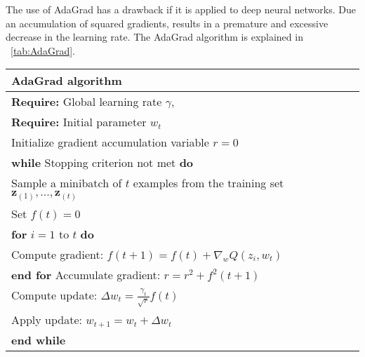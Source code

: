 The use of AdaGrad has a drawback if it is applied to deep neural networks. Due  an accumulation of squared gradients,  results in a premature and excessive decrease in the learning rate. The AdaGrad algorithm is explained in  ~\ref{tab:AdaGrad}.

\begin{center}
\begin{tabular}{| l |}
\hline
\textbf{AdaGrad algorithm}\\
\hline
\textbf{Require:} Global learning rate $\gamma$,\\
\textbf{Require:} Initial parameter $w_t$\\
 \hspace{1cm} Initialize gradient accumulation variable \textbf{$r=0$}\\
 \hspace{1cm} \textbf{while} Stopping criterion not met \textbf{do}\\
 \hspace{2cm} Sample a minibatch of $t$ examples from the training set $\textbf{z}_{(1)} ,...,        \textbf{z}_{(t)}$ \\
 \hspace{2cm} Set \textbf{$f(t) = 0$}\\
 \hspace{2cm} \textbf{for} $i=1$ to $t$ \textbf{do}\\
 \hspace{3cm} Compute gradient: \textbf{$f(t+1) = f(t) + \nabla_w Q(z_i,w_t)$}\\
 \hspace{2cm} \textbf{end for}
 \hspace{2cm} Accumulate gradient: \textbf{$r = r^2+f^2(t+1)$} \\
 \hspace{2cm} Compute update: \textbf{$\Delta w_t = \frac{\gamma_t}{\sqrt{r}} f(t)$}\\
 \hspace{2cm} Apply update: \textbf{$w_{t+1} = w_t + \Delta w_t$}\\
 \hspace{1cm} \textbf{end while}\\
\hline
\end{tabular}
\label{tab:AdaGrad}
\end{center}
\textcite{Bengio-et-al-2015-Book} \textcite{duchi2011adaptive}
